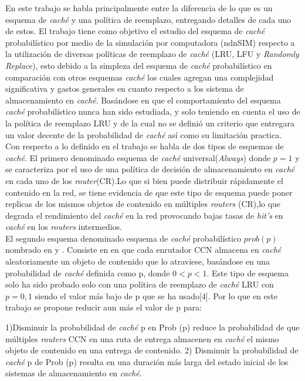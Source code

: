 \documentclass[12pt]{ociamthesis}  %
\begin{document}
En este trabajo se habla principalmente entre la diferencia de lo que es un esquema de \textit{caché} y una política de reemplazo, entregando detalles de cada uno de estos. El trabajo \cite{tarnoi2014performance} tiene como objetivo el estudio del esquema de \textit{caché} probabilístico por medio de la simulación por computadora (ndnSIM) respecto a la utilización de diversas políticas de reemplazo de \textit{caché} (LRU, LFU y \textit{Randomly Replace}), esto debido a la simpleza del esquema de \textit{caché} probabilístico en comparación con otros esquemas \textit{caché} los cuales agregan una complejidad significativa y gastos generales en cuanto respecto a los sistema de almacenamiento en \textit{caché}. Basándose \cite{tarnoi2014performance} en que el comportamiento del esquema \textit{caché} probabilístico nunca han sido estudiada, y solo teniendo en cuenta el uso de la política de reemplazo LRU y de la cual no se definió un criterio que entregara un valor decente de la probabilidad de \textit{caché} así como su limitación practica.\\

Con respecto a lo definido en el trabajo \cite{tarnoi2014performance} se habla de dos tipos de esquemas de \textit{caché}. El primero denominado esquema de \textit{caché} universal(\textit{Always}) donde $p = 1$ y se caracteriza por el uso de una política de decisión de almacenamiento en \textit{caché} en cada uno de los \textit{router}(CR).Lo que si bien puede distribuir rápidamente el contenido en la red, se tiene evidencia de que este tipo de esquema puede poner replicas de los mismos objetos de contenido en múltiples \textit{routers} (CR),lo que degrada el rendimiento del \textit{caché} en la red provocando bajas tasas de \textit{hit's} en \textit{caché} en los \textit{routers} intermedios.\\

El segundo esquema denominado esquema de \textit{caché} probabilístico $prob(p)$ nombrado en \cite{psaras2014network}\cite{rossini2013evaluating} y \cite{cho2012wave}. Consiste en en que cada enrutador CCN almacena en \textit{caché} aleatoriamente un objeto de contenido que lo atraviese, basándose en una probabilidad de \textit{caché} definida como p, donde $0 < p < 1$. Este tipo de esquema solo ha sido probado solo con una política de reemplazo de \textit{caché} LRU con $p = 0,1$ siendo el valor más bajo de p que se ha usado[4]. Por lo que en este trabajo se propone reducir aun más el valor de p para:

1)Disminuir la probabilidad de \textit{caché} p en Prob (p) reduce la probabilidad de que múltiples \textit{routers} CCN en una ruta de entrega almacenen en \textit{caché} el mismo objeto de contenido en una entrega de contenido.
2) Disminuir la probabilidad de \textit{caché} p de Prob (p) resulta en una duración más larga del estado inicial de los sistemas de almacenamiento en \textit{caché}.\\
\end{document}
